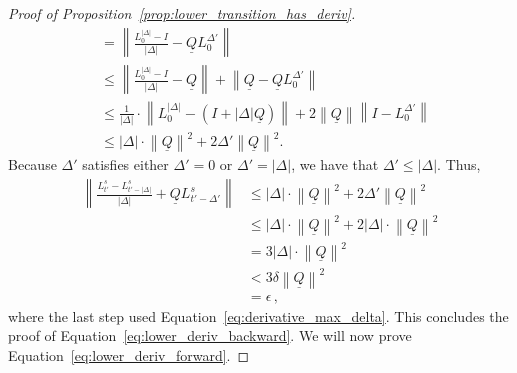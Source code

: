 \documentclass[10pt]{paper}
\theoremstyle{definition}
\newcommand{\lrate}{\underline{Q}}
\newcommand{\norm}[1]{\left\lVert #1 \right\rVert}
\begin{document}
\begin{proof}[Proof of Proposition~\ref{prop:lower_transition_has_deriv}]
\begin{align*}
 &= \norm{\frac{L_{0}^{\lvert\Delta\rvert} - I}{\lvert\Delta\rvert}-\lrate L_{0}^{\Delta'}} \\
 &\leq \norm{\frac{L_{0}^{\lvert\Delta\rvert} - I}{\lvert\Delta\rvert}-\lrate} + \norm{\lrate - \lrate L_{0}^{\Delta'}} \\
 &\leq \frac{1}{\lvert\Delta\rvert}\cdot\norm{L_{0}^{\lvert\Delta\rvert} - (I+\lvert\Delta\rvert\lrate)} + 2\norm{\lrate}\norm{I - L_{0}^{\Delta'}} \\
 &\leq \lvert\Delta\rvert\cdot\norm{\lrate}^2 + 2\Delta'\norm{\lrate}^2.
\end{align*}
Because $\Delta'$ satisfies either $\Delta'=0$ or $\Delta'=\lvert\Delta\rvert$, we have that $\Delta'\leq\lvert\Delta\rvert$. Thus,
\begin{align*}
\norm{\frac{L_{t'}^s - L_{t'-\lvert\Delta\rvert}^s}{\lvert\Delta\rvert}+\lrate L_{t'-\Delta'}^s} &\leq \lvert\Delta\rvert\cdot\norm{\lrate}^2 + 2\Delta'\norm{\lrate}^2 \\
 &\leq \lvert\Delta\rvert\cdot\norm{\lrate}^2 + 2\lvert\Delta\rvert\cdot\norm{\lrate}^2 \\
 &= 3\lvert\Delta\rvert\cdot\norm{\lrate}^2 \\
 &< 3\delta\norm{\lrate}^2 \\
 &= \epsilon\,,
\end{align*}
where the last step used Equation~\eqref{eq:derivative_max_delta}. This concludes the proof of Equation~\eqref{eq:lower_deriv_backward}. We will now prove Equation~\eqref{eq:lower_deriv_forward}.


\end{proof}
\end{document}

